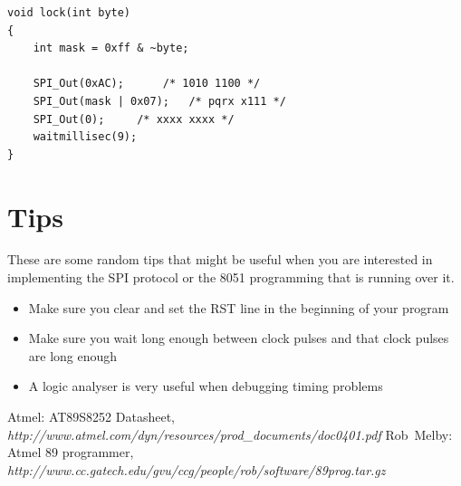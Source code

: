 \documentclass[a4paper]{article}
\begin{document}
\begin{lstlisting}
void lock(int byte)
{
	int mask = 0xff & ~byte;

	SPI_Out(0xAC);		/* 1010 1100 */
	SPI_Out(mask | 0x07);	/* pqrx x111 */
	SPI_Out(0);		/* xxxx xxxx */
	waitmillisec(9);
}
\end{lstlisting}

\section{Tips}

These are some random tips that might be useful when you are interested in
implementing the SPI protocol or the 8051 programming that is running over it.

\begin{itemize}
\item Make sure you clear and set the RST line in 
the beginning of your program
\item Make sure you wait long enough between clock pulses and that 
clock pulses are long enough
\item A logic analyser is very useful when debugging timing problems
\end{itemize}

\nocite{*}

\begin{thebibliography}{99}
\bibitem{} Atmel: AT89S8252 Datasheet, \emph{http://www.atmel.com/dyn/resources/prod\_documents/doc0401.pdf}
\bibitem{} Rob~Melby: Atmel 89 programmer, \emph{http://www.cc.gatech.edu/gvu/ccg/people/rob/software/89prog.tar.gz}
\end{thebibliography}
\end{document}
